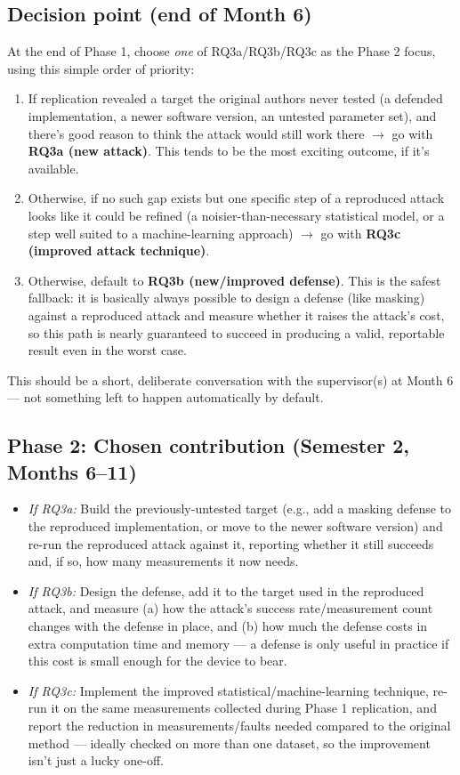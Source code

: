 \documentclass[11pt,a4paper]{article}
\begin{document}
\subsection*{Decision point (end of Month 6)}
At the end of Phase 1, choose \emph{one} of RQ3a/RQ3b/RQ3c as the Phase 2 focus, using this simple order of priority:
\begin{enumerate}[leftmargin=*]
  \item If replication revealed a target the original authors never tested (a defended implementation, a newer software version, an untested parameter set), and there's good reason to think the attack would still work there $\rightarrow$ go with \textbf{RQ3a (new attack)}. This tends to be the most exciting outcome, if it's available.
  \item Otherwise, if no such gap exists but one specific step of a reproduced attack looks like it could be refined (a noisier-than-necessary statistical model, or a step well suited to a machine-learning approach) $\rightarrow$ go with \textbf{RQ3c (improved attack technique)}.
  \item Otherwise, default to \textbf{RQ3b (new/improved defense)}. This is the safest fallback: it is basically always possible to design a defense (like masking) against a reproduced attack and measure whether it raises the attack's cost, so this path is nearly guaranteed to succeed in producing a valid, reportable result even in the worst case.
\end{enumerate}
This should be a short, deliberate conversation with the supervisor(s) at Month 6 --- not something left to happen automatically by default.

\subsection*{Phase 2: Chosen contribution (Semester 2, Months 6--11)}
\begin{itemize}[leftmargin=*]
  \item \emph{If RQ3a:} Build the previously-untested target (e.g., add a masking defense to the reproduced implementation, or move to the newer software version) and re-run the reproduced attack against it, reporting whether it still succeeds and, if so, how many measurements it now needs.
  \item \emph{If RQ3b:} Design the defense, add it to the target used in the reproduced attack, and measure (a) how the attack's success rate/measurement count changes with the defense in place, and (b) how much the defense costs in extra computation time and memory --- a defense is only useful in practice if this cost is small enough for the device to bear.
  \item \emph{If RQ3c:} Implement the improved statistical/machine-learning technique, re-run it on the same measurements collected during Phase 1 replication, and report the reduction in measurements/faults needed compared to the original method --- ideally checked on more than one dataset, so the improvement isn't just a lucky one-off.
\end{itemize}
\end{document}

